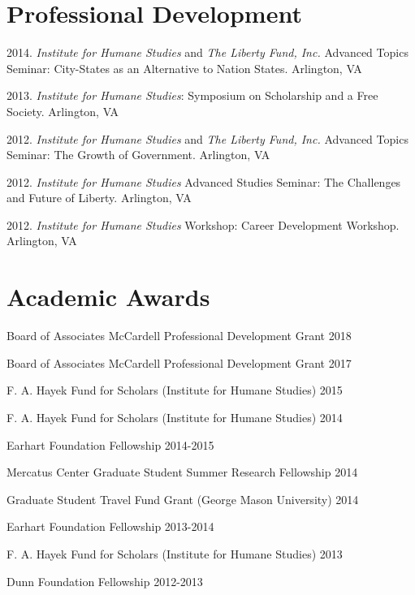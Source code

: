 \documentclass[]{article}
\renewenvironment{itemize}{
  \begin{list}{}{
    \setlength{\leftmargin}{1.5em}
  }
}{
  \end{list}
}
\begin{document}
\section*{Professional Development}\begin{itemize}
    \item 2014. \emph{Institute for Humane Studies} and \emph{The Liberty Fund, Inc.} Advanced Topics Seminar: City-States as an Alternative to Nation States. Arlington, VA
    \item 2013. \emph{Institute for Humane Studies}: Symposium on Scholarship and a Free Society. Arlington, VA
    \item 2012. \emph{Institute for Humane Studies} and \emph{The Liberty Fund, Inc.} Advanced Topics Seminar: The Growth of Government. Arlington, VA
    \item 2012. \emph{Institute for Humane Studies} Advanced Studies Seminar: The Challenges and Future of Liberty. Arlington, VA
    \item 2012. \emph{Institute for Humane Studies} Workshop: Career Development Workshop. Arlington, VA
\end{itemize}

\section*{Academic Awards}\begin{itemize}
    \item Board of Associates McCardell Professional Development Grant 2018
    \item Board of Associates McCardell Professional Development Grant 2017
    \item F. A. Hayek Fund for Scholars (Institute for Humane Studies) 2015
    \item F. A. Hayek Fund for Scholars (Institute for Humane Studies) 2014
    \item Earhart Foundation Fellowship 2014-2015
    \item Mercatus Center Graduate Student Summer Research Fellowship 2014
    \item Graduate Student Travel Fund Grant (George Mason University) 2014
    \item Earhart Foundation Fellowship 2013-2014
    \item F. A. Hayek Fund for Scholars (Institute for Humane Studies) 2013
    \item Dunn Foundation Fellowship 2012-2013
\end{itemize}
\end{document}
